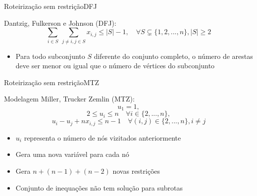 \documentclass{beamer}
\begin{document}
\begin{frame}{Roteirização sem restrição}{DFJ}

Dantzig, Fulkerson e Johnson (DFJ):
$$ \sum_{i \in S}\ \sum_{j \neq i, j \in S} x_{i,j} \le |S|-1, \quad \forall S \subsetneq \{1,2,...,n\}, |S|\ge 2$$
\begin{itemize}
    \item Para todo subconjunto $S$ diferente do conjunto completo, o número de arestas deve ser menor ou igual que o número de vértices do subconjunto
\end{itemize}

\end{frame}

\begin{frame}{Roteirização sem restrição}{MTZ}

Modelagem Miller, Trucker Zemlin (MTZ):
$$u_1 = 1,$$
$$2 \le u_i \le n \quad \forall i \in \{2,...,n\},$$
$$u_i - u_j + nx_{i,j}\le n-1 \quad \forall (i,j) \in \{2,...,n\}, i \ne j$$
\begin{itemize}
    \item $u_i$ representa o número de nós vizitados anteriormente
    \item Gera uma nova variável para cada nó
    \item Gera $n+(n-1)+(n-2)$ novas restrições
    \item Conjunto de inequações não tem solução para subrotas
\end{itemize}
\end{frame}
\end{document}
